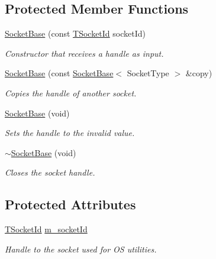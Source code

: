 \subsection*{Protected Member Functions}
\begin{DoxyCompactItemize}
\item 
\hyperlink{class_socket_base_afdeb4c469db205b8030ff65540adbbc8}{Socket\-Base} (const \hyperlink{class_socket_base_aad53265037e46768af4d6a0c2ebed277}{T\-Socket\-Id} socket\-Id)
\begin{DoxyCompactList}\small\item\em Constructor that receives a handle as input. \end{DoxyCompactList}\item 
\hyperlink{class_socket_base_aae440e9ad170eeec2465c4501e91b761}{Socket\-Base} (const \hyperlink{class_socket_base}{Socket\-Base}$<$ Socket\-Type $>$ \&copy)
\begin{DoxyCompactList}\small\item\em Copies the handle of another socket. \end{DoxyCompactList}\item 
\hyperlink{class_socket_base_ab53eb639e056af7269e0d720736f48e2}{Socket\-Base} (void)
\begin{DoxyCompactList}\small\item\em Sets the handle to the invalid value. \end{DoxyCompactList}\item 
\hyperlink{class_socket_base_aa19d43bd8b53e91b1600c7b60f8f48e0}{$\sim$\-Socket\-Base} (void)
\begin{DoxyCompactList}\small\item\em Closes the socket handle. \end{DoxyCompactList}\end{DoxyCompactItemize}
\subsection*{Protected Attributes}
\begin{DoxyCompactItemize}
\item 
\hyperlink{class_socket_base_aad53265037e46768af4d6a0c2ebed277}{T\-Socket\-Id} \hyperlink{class_socket_base_aa9d855a8843ac61555721dfbedbad5a8}{m\-\_\-socket\-Id}
\begin{DoxyCompactList}\small\item\em Handle to the socket used for O\-S utilities. \end{DoxyCompactList}\end{DoxyCompactItemize}

